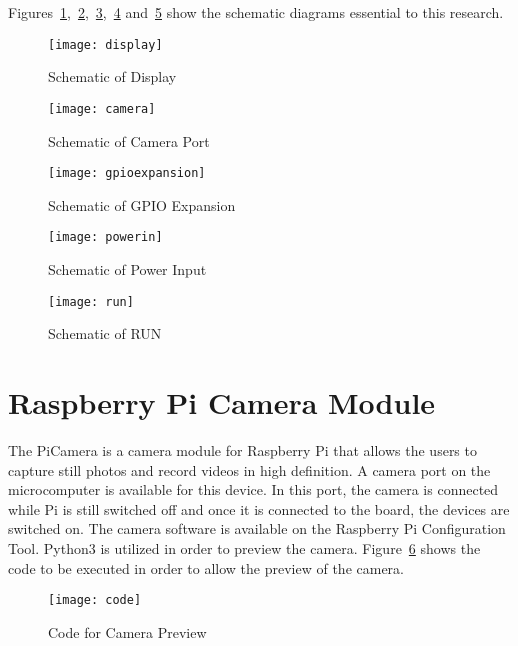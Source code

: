 Figures~\ref{fig:display},~\ref{fig:camera},~\ref{fig:gpioexpansion},~\ref{fig:powerin} and~\ref{fig:run} show the schematic diagrams essential to this research.

\begin{figure}[!htbp]
	\centering
		\texttt{[image: display]}
	\caption{Schematic of Display}
	\label{fig:display}
\end{figure}

\begin{figure}[!htbp]
	\centering
		\texttt{[image: camera]}
	\caption{Schematic of Camera Port}
	\label{fig:camera}
\end{figure}

\begin{figure}[!htbp]
	\centering
		\texttt{[image: gpioexpansion]}
	\caption{Schematic of GPIO Expansion}
	\label{fig:gpioexpansion}
\end{figure}

\begin{figure}[!htbp]
	\centering
		\texttt{[image: powerin]}
	\caption{Schematic of Power Input}
	\label{fig:powerin}
\end{figure}

\begin{figure}[!htbp]
	\centering
		\texttt{[image: run]}
	\caption{Schematic of RUN}
	\label{fig:run}
\end{figure}

\section{Raspberry Pi Camera Module}

The PiCamera is a camera module for Raspberry Pi that allows the users to capture still photos and record videos in high definition. A camera port on the microcomputer is available for this device. In this port, the camera is connected while Pi is still switched off and once it is connected to the board, the devices are switched on. The camera software is available on the Raspberry Pi Configuration Tool. Python3 is utilized in order to preview the camera. Figure~\ref{fig:code} shows the code to be executed in order to allow the preview of the camera.~\cite{camers}

\begin{figure}[!htbp]
	\centering
		\texttt{[image: code]}
	\caption{Code for Camera  Preview}
	\label{fig:code}
\end{figure}

